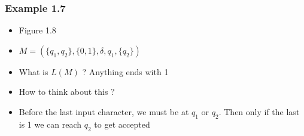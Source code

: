 \begin{frame}[allowframebreaks] \frametitle{Example 1.7}
  \begin{itemize}
  \item Figure 1.8

\item $M=(\{q_1,q_2\}, \{0,1\},
\delta, q_1, \{q_2\})$
\item What is $L(M)$ ?
Anything ends with 1

\item How to think about this ?

\item Before the last input character, we must
  be at $q_1$ or $q_2$. Then only if the last is 1 we
  can reach $q_2$ to get accepted
\end{itemize}\end{frame}


